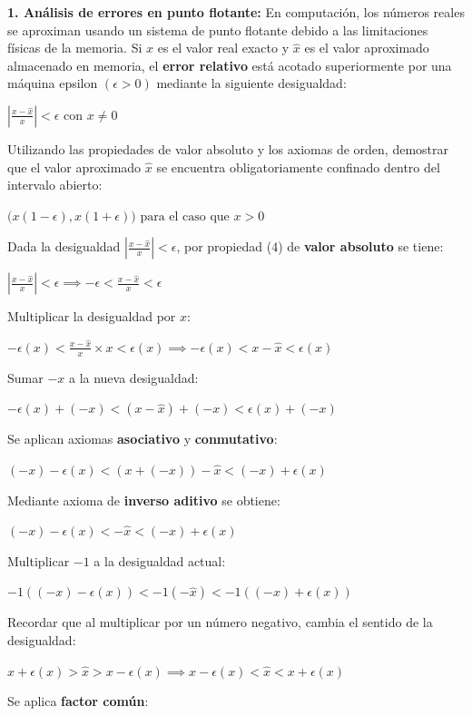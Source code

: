 \documentclass{article}
\begin{document}
\textbf{1. Análisis de errores en punto flotante:} En computación, los números reales se aproximan usando un sistema de punto flotante debido a las limitaciones físicas de la memoria. Si $x$ es el valor real exacto y $\hat{x}$ es el valor aproximado almacenado en memoria, el \textbf{error relativo} está acotado superiormente por una máquina epsilon $(\epsilon > 0)$ mediante la siguiente desigualdad:

$\displaystyle \left| \frac{x - \hat{x}}{x} \right| < \epsilon \text{ con } x \neq 0$

Utilizando las propiedades de valor absoluto y los axiomas de orden, demostrar que el valor aproximado $\hat{x}$ se encuentra obligatoriamente confinado dentro del intervalo abierto:

$\Big(x(1 - \epsilon), x(1 + \epsilon)\Big) \text{ para el caso que } x > 0$

Dada la desigualdad $\displaystyle \left| \frac{x - \hat{x}}{x} \right| < \epsilon$, por propiedad (4) de \textbf{valor absoluto} se tiene:

$\displaystyle \left| \frac{x - \hat{x}}{x} \right| < \epsilon \implies -\epsilon < \frac{x - \hat{x}}{x} < \epsilon$

Multiplicar la desigualdad por $x$:

$\displaystyle -\epsilon(x) < \frac{x - \hat{x}}{x} \times x < \epsilon(x) \implies -\epsilon(x) < x - \hat{x} < \epsilon(x)$

Sumar $- x $ a la nueva desigualdad:

$-\epsilon(x) + (- x) < (x - \hat{x}) + (- x) < \epsilon(x) + (-x)$

Se aplican axiomas \textbf{asociativo} y \textbf{conmutativo}:

$(- x) -\epsilon(x) < (x + (- x)) - \hat{x} < (-x) + \epsilon(x)$

Mediante axioma de \textbf{inverso aditivo} se obtiene:

$(- x) -\epsilon(x) < - \hat{x} < (-x) + \epsilon(x)$

Multiplicar $-1$ a la desigualdad actual:

$-1 ((- x) -\epsilon(x)) < -1 (- \hat{x}) < -1 ((-x) + \epsilon(x))$

Recordar que al multiplicar por un número negativo, cambia el sentido de la desigualdad:

$x + \epsilon(x) > \hat{x} > x - \epsilon(x) \implies x - \epsilon(x) < \hat{x} < x + \epsilon(x)$

Se aplica \textbf{factor común}:
\end{document}
